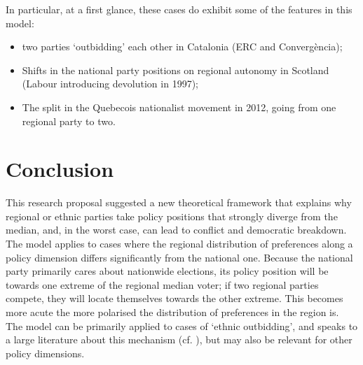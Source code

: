 \documentclass[11pt]{article}
\begin{document}
In particular, at a first glance, these cases do exhibit some of the features in this model: 
\begin{itemize}
    \item two parties `outbidding' each other in Catalonia (ERC and Convergència);
    \item Shifts in the national party positions on regional autonomy in Scotland (Labour introducing devolution in 1997);
    \item The split in the Quebecois nationalist movement in 2012, going from one regional party to two.
\end{itemize}

\section{Conclusion}

This research proposal suggested a new theoretical framework that explains why regional or ethnic parties take policy positions that strongly diverge from the median, and, in the worst case, can lead to conflict and democratic breakdown. The model applies to cases where the regional distribution of preferences along a policy dimension differs significantly from the national one. Because the national party primarily cares about nationwide elections, its policy position will be towards one extreme of the regional median voter; if two regional parties compete, they will locate themselves towards the other extreme. This becomes more acute the more polarised the distribution of preferences in the region is. The model can be primarily applied to cases of `ethnic outbidding', and speaks to a large literature about this mechanism (cf. \textcite{Horowitz2000}), but may also be relevant for other policy dimensions.

\renewcommand*{\mkbibnamefamily}[1]{\textsc{\textbf{#1}}}
\renewcommand*{\mkbibnamegiven}[1]{\textsc{#1}}
\printbibliography
\end{document}
